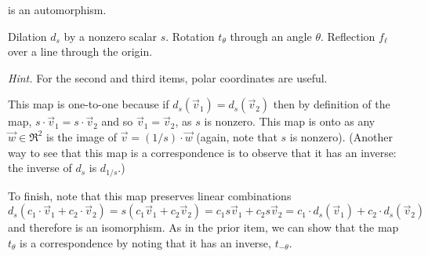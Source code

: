 \begin{exercises}
    is an automorphism.
    \begin{exparts}
      \partsitem Dilation $d_s$ by a nonzero scalar \( s \).
      \partsitem Rotation $t_\theta$ through an angle \( \theta \).
      \partsitem Reflection $f_\ell$ over a line through the origin.
    \end{exparts}
    \textit{Hint.}
     For the second and third items, polar coordinates are useful.
    \begin{answer}
      \begin{exparts}
        \partsitem 
          This map is one-to-one because if \( d_s(\vec{v}_1)=d_s(\vec{v}_2) \)
          then by definition of the map,
          \( s\cdot\vec{v}_1=s\cdot\vec{v}_2 \) and so 
          \( \vec{v}_1=\vec{v}_2 \), as \( s \) is nonzero.
          This map is onto as any \( \vec{w}\in\Re^2 \) is the image of
          \( \vec{v}=(1/s)\cdot\vec{w} \) (again, note that $s$ is nonzero).
          (Another way to see that this map 
          is a correspondence is to observe that it has
          an inverse: the inverse of \( d_s \) is \( d_{1/s} \).)

          To finish, note that this map preserves linear combinations
          \begin{equation*}
            d_s(c_1\cdot\vec{v}_1+c_2\cdot\vec{v}_2)
            =s(c_1\vec{v}_1+c_2\vec{v}_2)
            =c_1s\vec{v}_1+c_2s\vec{v}_2
            =c_1\cdot d_s(\vec{v}_1)+c_2\cdot d_s(\vec{v}_2)
          \end{equation*}
          and therefore is an isomorphism.
        \partsitem As in the prior item, we can show that the map $t_\theta$
          is a correspondence by noting that it has an inverse, $t_{-\theta}$.


\end{exparts}
\end{answer}
\end{exercises}
